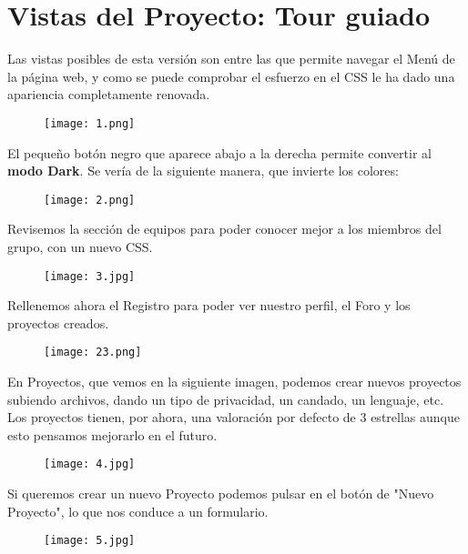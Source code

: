 \documentclass[12pt]{report}
\begin{document}
\section{Vistas del Proyecto: Tour guiado}
Las vistas posibles de esta versión son entre las que permite navegar el Menú de la página web, y como se puede comprobar el esfuerzo en el CSS le ha dado una apariencia completamente renovada. 

\begin{figure}[!h]
 \centering
  \texttt{[image: 1.png]}
\end{figure}

El pequeño botón negro que aparece abajo a la derecha permite convertir al \textbf{modo Dark}. Se vería de la siguiente manera, que invierte los colores:

\begin{figure}[!h]
 \centering
  \texttt{[image: 2.png]}
\end{figure}

Revisemos la sección de equipos para poder conocer mejor a los miembros del grupo, con un nuevo CSS.

\begin{figure}[h]
 \centering
  \texttt{[image: 3.jpg]}
\end{figure}

Rellenemos ahora el Registro para poder ver nuestro perfil, el Foro y los proyectos creados.

\begin{figure}[h]
 \centering
  \texttt{[image: 23.png]}
\end{figure}

En Proyectos, que vemos en la siguiente imagen, podemos crear nuevos proyectos subiendo archivos, dando un tipo de privacidad, un candado, un lenguaje, etc. Los proyectos tienen, por ahora, una valoración por defecto de 3 estrellas aunque esto pensamos mejorarlo en el futuro.
\newpage
\begin{figure}[!h]
 \centering
  \texttt{[image: 4.jpg]}
\end{figure}

Si queremos crear un nuevo Proyecto podemos pulsar en el botón de "Nuevo Proyecto", lo que nos conduce a un formulario.

\begin{figure}[!h]
 \centering
  \texttt{[image: 5.jpg]}
\end{figure}
\end{document}
